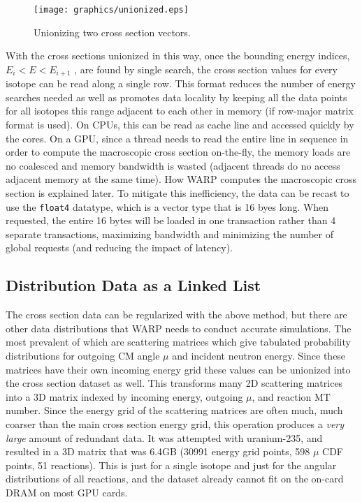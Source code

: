 \begin{figure}[h!] 
\centering
\texttt{[image: graphics/unionized.eps]}
\caption{Unionizing two cross section vectors. \label{unionized_layout} }
\end{figure}

With the cross sections unionized in this way, once the bounding energy indices, $E_i<E<E_{i+1}$ , are found by single search, the cross section values for every isotope can be read along a single row.  This format reduces the number of energy searches needed as well as promotes data locality by keeping all the data points for all isotopes this range adjacent to each other in memory (if row-major matrix format is used).  On CPUs, this can be read as cache line and accessed quickly by the cores.  On a GPU, since a thread needs to read the entire line in sequence in order to compute the macroscopic cross section on-the-fly, the memory loads are no coalesced and memory bandwidth is wasted (adjacent threads do no access adjacent memory at the same time).  How WARP computes the macroscopic cross section is explained later.  To mitigate this inefficiency, the data can be recast to use the  \lstinline{float4} datatype, which is a vector type that is 16 byes long.  When requested, the entire 16 bytes will be loaded in one transaction rather than 4 separate transactions, maximizing bandwidth and minimizing the number of global requests (and reducing the impact of latency).

\subsection{Distribution Data as a Linked List}

The cross section data can be regularized with the above method, but there are other data distributions that WARP needs to conduct accurate simulations.  The most prevalent of which are scattering matrices which give tabulated probability distributions for outgoing CM angle $\mu$ and incident neutron energy.  Since these matrices have their own incoming energy grid these values can be unionized into the cross section dataset as well.  This transforms many 2D scattering matrices into a 3D matrix indexed by incoming energy, outgoing $\mu$, and reaction MT number.  Since the energy grid of the scattering matrices are often much, much coarser than the main cross section energy grid, this operation produces a \emph{very large} amount of redundant data.  It was attempted with uranium-235, and resulted in a 3D matrix that was 6.4GB (30991 energy grid points, 598 $\mu$ CDF points, 51 reactions).  This is just for a single isotope and just for the angular distributions of all reactions, and the dataset already cannot fit on the on-card DRAM on most GPU cards.  

